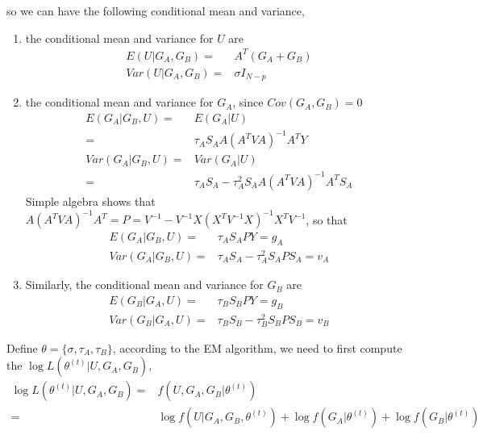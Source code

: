 \documentclass{article}
\begin{document}
            so we can have the following conditional mean and variance,
            \begin{enumerate}
                \item the conditional mean and variance for $U$ are
                    \[\begin{split}
                        E(U|G_A,G_B)=&A^T(G_A+G_B)\\
                        Var(U|G_A,G_B) = & \sigma I_{N-p}
                    \end{split}\]
                \item the conditional mean and variance for $G_A$, since $Cov(G_A,G_B)=0$
                    \[\begin{split}
                        E(G_A|G_B,U)=&E(G_A|U)\\
                                                   =&\tau_AS_AA(A^TVA)^{-1}A^TY\\
                        Var(G_A|G_B,U)=&Var(G_A|U)\\
                                                       =&\tau_AS_A-\tau_A^2S_AA(A^TVA)^{-1}A^TS_A
                    \end{split}\]
                    Simple algebra shows that $A(A^TVA)^{-1}A^T=P=V^{-1}-V^{-1}X(X^TV^{-1}X)^{-1}X^TV^{-1}$, so that
                    \[\begin{split}
                        E(G_A|G_B,U)=&\tau_AS_APY=g_A\\
                        Var(G_A|G_B,U)=&\tau_AS_A-\tau_A^2S_APS_A=v_A
                    \end{split}\]
                \item Similarly, the conditional mean and variance for $G_B$ are
                     \[\begin{split}
                        E(G_B|G_A,U)=&\tau_BS_BPY=g_B\\
                        Var(G_B|G_A,U)=&\tau_BS_B-\tau_B^2S_BPS_B=v_B
                    \end{split}\]
            \end{enumerate}

            Define $\theta=\{\sigma,\tau_A,\tau_B\}$, according to the EM algorithm, we need to first compute the $\log L(\theta^{(t)}|U,G_A,G_B)$,
            \[\begin{split}
                \log L(\theta^{(t)}|U,G_A,G_B)=&f(U,G_A,G_B|\theta^{(t)})\\
                                                                         =&\log f(U|G_A,G_B,\theta^{(t)})+\log f(G_A|\theta^{(t)})+\log f(G_B|\theta^{(t)})
            \end{split}\]
\end{document}
